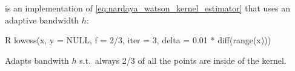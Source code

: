 \begin{defncbox}
        \begin{defnc}\label{defnc:lowes}
        is an implementation of \cref{eq:nardaya_watson_kernel_estimator} that uses an adaptive bandwidth $h$:\\
            \begin{mintlinebox}{R}
                lowess(x, y = NULL, f = 2/3, iter = 3, delta = 0.01 * diff(range(x)))
            \end{mintlinebox}
        \end{defnc}
\end{defncbox}
\begin{optionsbox}{}
    Adapts bandwith $h$ s.t.\ always 2/3 of all the points are inside of the kernel.
\end{optionsbox}


